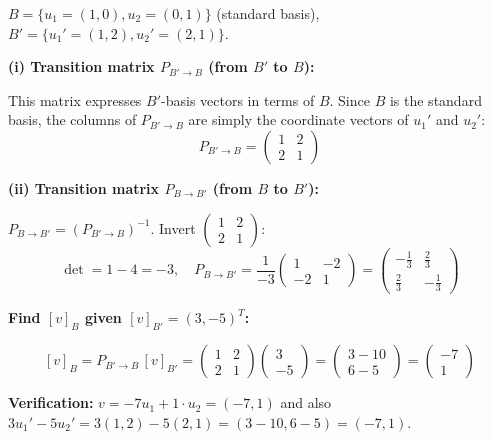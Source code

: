 \documentclass[12pt,a3paper]{article}
\begin{document}
\begin{tcolorbox}[enhanced,breakable,colback=cC!4,colframe=cC,
  boxrule=0.8pt,arc=5pt,
  title={\textbf{Answer}},
  fonttitle=\bfseries\color{white},colbacktitle=cC]

$B=\{u_1=(1,0),u_2=(0,1)\}$ (standard basis), $B'=\{u_1'=(1,2),u_2'=(2,1)\}$.

\medskip
\textbf{(i) Transition matrix $P_{B'\to B}$ (from $B'$ to $B$):}

This matrix expresses $B'$-basis vectors in terms of $B$.  Since $B$ is the standard basis, the columns of $P_{B'\to B}$ are simply the coordinate vectors of $u_1'$ and $u_2'$:
\[
P_{B'\to B}=\begin{pmatrix}1&2\\2&1\end{pmatrix}
\]

\medskip
\textbf{(ii) Transition matrix $P_{B\to B'}$ (from $B$ to $B'$):}

$P_{B\to B'}=(P_{B'\to B})^{-1}$.  Invert $\begin{pmatrix}1&2\\2&1\end{pmatrix}$:
\[
\det = 1-4=-3,\quad
P_{B\to B'}=\frac{1}{-3}\begin{pmatrix}1&-2\\-2&1\end{pmatrix}=\begin{pmatrix}-\tfrac{1}{3}&\tfrac{2}{3}\\\tfrac{2}{3}&-\tfrac{1}{3}\end{pmatrix}
\]

\medskip
\textbf{Find $[v]_B$ given $[v]_{B'}=(3,-5)^T$:}

\[
[v]_B = P_{B'\to B}\,[v]_{B'}=\begin{pmatrix}1&2\\2&1\end{pmatrix}\begin{pmatrix}3\\-5\end{pmatrix}=\begin{pmatrix}3-10\\6-5\end{pmatrix}=\begin{pmatrix}-7\\1\end{pmatrix}
\]

\textbf{Verification:} $v = -7u_1+1\cdot u_2=(-7,1)$ and also $3u_1'-5u_2'=3(1,2)-5(2,1)=(3-10,6-5)=(-7,1)$. \checkmark
\end{tcolorbox}
\end{document}
